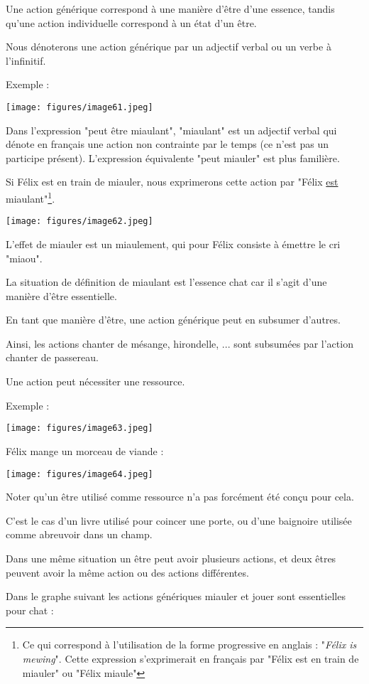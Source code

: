 \documentclass[a4paper, 12pt, openright, french]{book}
\begin{document}
Une action générique correspond à une manière d'être
d'une essence, tandis qu'une action
individuelle correspond à un état d'un être.

Nous dénoterons une action générique par un adjectif verbal ou un verbe
à l'infinitif.

Exemple :

\texttt{[image: figures/image61.jpeg]}

Dans l'expression "peut être miaulant", "miaulant" est
un adjectif verbal qui dénote en français une action non contrainte par
le temps (ce n'est pas un participe présent).
L'expression équivalente "peut miauler" est plus
familière.

Si Félix est en train de miauler, nous exprimerons
cette action par "Félix \uline{est} miaulant"\footnote{Ce qui correspond à l'utilisation de
	la forme progressive en anglais : "\emph{Félix is mewing}". Cette
	expression s'exprimerait en français par "Félix est en
	train de miauler" ou "Félix miaule"}.

\texttt{[image: figures/image62.jpeg]}

L'effet de miauler est un miaulement, qui pour Félix
consiste à émettre le cri "miaou".


La situation de définition de miaulant est l'essence
chat car il s'agit d'une manière
d'être essentielle.

En tant que manière d'être, une action générique peut en
subsumer d'autres.

Ainsi, les actions chanter de mésange, hirondelle, ... sont subsumées
par l'action chanter de passereau.

Une action peut nécessiter une ressource.

Exemple :

\texttt{[image: figures/image63.jpeg]}

Félix mange un morceau de viande :

\texttt{[image: figures/image64.jpeg]}

Noter qu'un être utilisé comme ressource
n'a pas forcément été conçu pour cela.

C'est le cas d'un livre utilisé pour
coincer une porte, ou d'une baignoire utilisée comme
abreuvoir dans un champ.

Dans une même situation un être peut avoir plusieurs actions, et deux
êtres peuvent avoir la même action ou des actions différentes.

Dans le graphe suivant les actions génériques miauler et jouer sont
essentielles pour chat :
\end{document}
